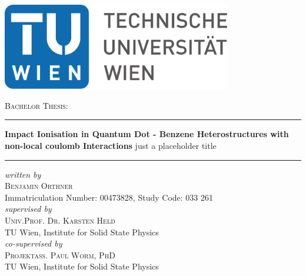 \documentclass[oneside]{scrbook}			%
\begin{document}
\begin{titlepage}
\begin{center}
    \vspace*{15mm}
    \includegraphics[width=100mm]{./graph/TU_Logo.pdf}
    
    \vspace{20mm}
    
    {\Large \textsc{Bachelor Thesis:}}
    
    \vspace{7mm}
    
    \rule{\textwidth}{0.4pt}\vspace{5mm}
    {\LARGE \textbf{Impact Ionisation in Quantum Dot - Benzene Heterostructures with non-local coulomb Interactions}} just a placeholder title\\[3mm]
    \rule{\textwidth}{0.4pt}
    
    \vspace{15mm}
    \emph{written by}\\
    {\Large \textsc{Benjamin Orthner}}\\
    Immatriculation Number: 00473828, Study Code: 033 261\\
    
    \vspace{15mm}
    \emph{supervised by}\\
    {\Large \textsc{Univ.Prof. Dr. Karsten Held}}\\
    TU Wien, Institute for Solid State Physics\\
    
    \vspace{15mm}
    \emph{co-supervised by}\\
    {\Large \textsc{Projektass. Paul Worm, PhD}}\\
    TU Wien, Institute for Solid State Physics\\
\end{center}

  \date{\today}
\vspace{\fill}
\begin{flushright} %
\makeatletter
\@date
\makeatother
\end{flushright}
\end{titlepage}
\end{document}
